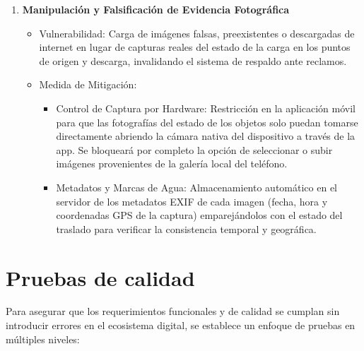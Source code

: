 \begin{enumerate}
	\item \textbf{Manipulación y Falsificación de Evidencia Fotográfica}
	\begin{itemize}
		\item Vulnerabilidad: Carga de imágenes falsas, preexistentes o descargadas de internet en lugar de capturas reales del estado de la carga en los puntos de origen y descarga, invalidando el sistema de respaldo ante reclamos.
		\item Medida de Mitigación:
		\begin{itemize}
			\item Control de Captura por Hardware: Restricción en la aplicación móvil para que las fotografías del estado de los objetos solo puedan tomarse directamente abriendo la cámara nativa del dispositivo a través de la app. Se bloqueará por completo la opción de seleccionar o subir imágenes provenientes de la galería local del teléfono.
			\item Metadatos y Marcas de Agua: Almacenamiento automático en el servidor de los metadatos EXIF de cada imagen (fecha, hora y coordenadas GPS de la captura) emparejándolos con el estado del traslado para verificar la consistencia temporal y geográfica.
		\end{itemize}
	\end{itemize}
		
\end{enumerate}

\section{Pruebas de calidad}

Para asegurar que los requerimientos funcionales y de calidad se cumplan sin introducir errores en el ecosistema digital, se establece un enfoque de pruebas en múltiples niveles: 

